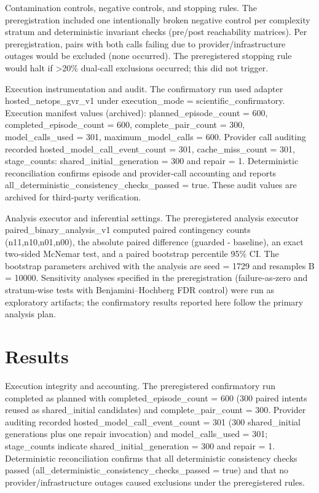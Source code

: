 \documentclass[conference]{IEEEtran}
\begin{document}
Contamination controls, negative controls, and stopping rules. The preregistration included one intentionally broken negative control per complexity stratum and deterministic invariant checks (pre/post reachability matrices). Per preregistration, pairs with both calls failing due to provider/infrastructure outages would be excluded (none occurred). The preregistered stopping rule would halt if >20\% dual‑call exclusions occurred; this did not trigger.

Execution instrumentation and audit. The confirmatory run used adapter hosted\_netops\_gvr\_v1 under execution\_mode = scientific\_confirmatory. Execution manifest values (archived): planned\_episode\_count = 600, completed\_episode\_count = 600, complete\_pair\_count = 300, model\_calls\_used = 301, maximum\_model\_calls = 600. Provider call auditing recorded hosted\_model\_call\_event\_count = 301, cache\_miss\_count = 301, stage\_counts: shared\_initial\_generation = 300 and repair = 1. Deterministic reconciliation confirms episode and provider‑call accounting and reports all\_deterministic\_consistency\_checks\_passed = true. These audit values are archived for third‑party verification.

Analysis executor and inferential settings. The preregistered analysis executor paired\_binary\_analysis\_v1 computed paired contingency counts (n11,n10,n01,n00), the absolute paired difference (guarded - baseline), an exact two‑sided McNemar test, and a paired bootstrap percentile 95\% CI. The bootstrap parameters archived with the analysis are seed = 1729 and resamples B = 10000. Sensitivity analyses specified in the preregistration (failure‑as‑zero and stratum‑wise tests with Benjamini--Hochberg FDR control) were run as exploratory artifacts; the confirmatory results reported here follow the primary analysis plan.

\section{Results}
Execution integrity and accounting. The preregistered confirmatory run completed as planned with completed\_episode\_count = 600 (300 paired intents reused as shared\_initial candidates) and complete\_pair\_count = 300. Provider auditing recorded hosted\_model\_call\_event\_count = 301 (300 shared\_initial generations plus one repair invocation) and model\_calls\_used = 301; stage\_counts indicate shared\_initial\_generation = 300 and repair = 1. Deterministic reconciliation confirms that all deterministic consistency checks passed (all\_deterministic\_consistency\_checks\_passed = true) and that no provider/infrastructure outages caused exclusions under the preregistered rules.
\end{document}
